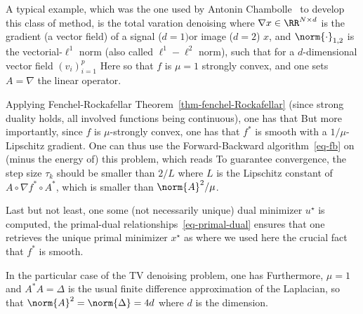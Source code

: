 \begin{exmp}[TV denoising]
A typical example, which was the one used by Antonin Chambolle~\cite{chambolle-algo-tv} to develop this class of method, is the total varation denoising
where $\nabla x \in \RR^{N \times d}$ is the gradient (a vector field) of a signal ($d=1) $or image ($d=2$) $x$, and $\norm{\cdot}_{1,2}$ is the vectorial-$\ell^1$ norm (also called $\ell^1-\ell^2$ norm), such that for a $d$-dimensional vector field $(v_i)_{i=1}^p$ 
Here 
so that $f$ is $\mu=1$ strongly convex, and one sets $A=\nabla$ the linear operator.
\end{exmp}


Applying Fenchel-Rockafellar Theorem~\ref{thm-fenchel-Rockafellar} (since strong duality holds, all involved functions being continuous), one has that 
But more importantly, since $f$ is $\mu$-strongly convex, one has that $f^*$ is smooth with a $1/\mu$-Lipschitz gradient. One can thus use the Forward-Backward algorithm~\eqref{eq-fb} on (minus the energy of) this problem, which reads
To guarantee convergence, the step size $\tau_k$ should be smaller than $2/L$ where $L$ is the Lipschitz constant of $A \circ \nabla f^* \circ A^*$, which is smaller than $\norm{A}^2/\mu$. 

Last but not least, one some (not necessarily unique) dual minimizer $u^\star$ is computed, the primal-dual relationships~\eqref{eq-primal-dual} ensures that one retrieves the unique primal minimizer $x^\star$ as
where we used here the crucial fact that $f^*$ is smooth.

\begin{exmp}[TV denoising]
In the particular case of the TV denoising problem, one has
Furthermore, $\mu=1$ and $A^*A=\Delta$ is the usual finite difference approximation of the Laplacian, so that $\norm{A}^2=\norm{\Delta}=4d$ where $d$ is the dimension.
\end{exmp}


